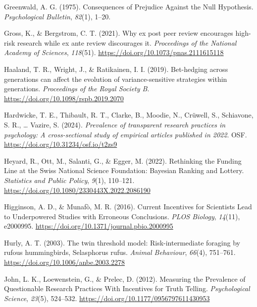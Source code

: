 \documentclass[
  ,man,mask,floatsintext]{apa6}
\newlength{\cslhangindent}
\newlength{\cslentryspacingunit} %
\newenvironment{CSLReferences}[2] %
 {%
  \setlength{\parindent}{0pt}
  \ifodd #1
  \let\oldpar\par
  \def\par{\hangindent=\cslhangindent\oldpar}
  \fi
  \setlength{\parskip}{#2\cslentryspacingunit}
 }%
 {}
\begin{document}
\begin{CSLReferences}{1}{0}
\leavevmode{}%
Greenwald, A. G. (1975). Consequences of {Prejudice Against} the {Null Hypothesis}. \emph{Psychological Bulletin}, \emph{82}(1), 1--20.

\leavevmode{}%
Gross, K., \& Bergstrom, C. T. (2021). Why ex post peer review encourages high-risk research while ex ante review discourages it. \emph{Proceedings of the National Academy of Sciences}, \emph{118}(51). \url{https://doi.org/10.1073/pnas.2111615118}

\leavevmode{}%
Haaland, T. R., Wright, J., \& Ratikainen, I. I. (2019). Bet-hedging across generations can affect the evolution of variance-sensitive strategies within generations. \emph{Proceedings of the Royal Society B}. \url{https://doi.org/10.1098/rspb.2019.2070}

\leavevmode{}%
Hardwicke, T. E., Thibault, R. T., Clarke, B., Moodie, N., Crüwell, S., Schiavone, S. R., \ldots{} Vazire, S. (2024). \emph{Prevalence of transparent research practices in psychology: {A} cross-sectional study of empirical articles published in 2022}. OSF. \url{https://doi.org/10.31234/osf.io/t2zs9}

\leavevmode{}%
Heyard, R., Ott, M., Salanti, G., \& Egger, M. (2022). Rethinking the {Funding Line} at the {Swiss National Science Foundation}: {Bayesian Ranking} and {Lottery}. \emph{Statistics and Public Policy}, \emph{9}(1), 110--121. \url{https://doi.org/10.1080/2330443X.2022.2086190}

\leavevmode{}%
Higginson, A. D., \& Munafò, M. R. (2016). Current {Incentives} for {Scientists Lead} to {Underpowered Studies} with {Erroneous Conclusions}. \emph{PLOS Biology}, \emph{14}(11), e2000995. \url{https://doi.org/10.1371/journal.pbio.2000995}

\leavevmode{}%
Hurly, A. T. (2003). The twin threshold model: Risk-intermediate foraging by rufous hummingbirds, {Selasphorus} rufus. \emph{Animal Behaviour}, \emph{66}(4), 751--761. \url{https://doi.org/10.1006/anbe.2003.2278}

\leavevmode{}%
John, L. K., Loewenstein, G., \& Prelec, D. (2012). Measuring the {Prevalence} of {Questionable Research Practices With Incentives} for {Truth Telling}. \emph{Psychological Science}, \emph{23}(5), 524--532. \url{https://doi.org/10.1177/0956797611430953}


\end{CSLReferences}
\end{document}
